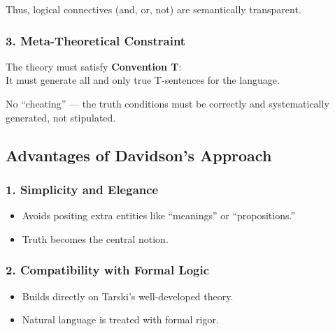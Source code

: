\documentclass[12pt]{article}
\newcommand{\tightlist}{\itemsep 0pt\parskip 0pt\parsep 0pt}
\begin{document}
Thus, logical connectives (and, or, not) are semantically transparent.

\hypertarget{meta-theoretical-constraint}{%
\subsubsection{\texorpdfstring{3. \textbf{Meta-Theoretical
Constraint}}{3. Meta-Theoretical Constraint}}\label{meta-theoretical-constraint}}

The theory must satisfy \textbf{Convention T}:\\
It must generate all and only true T-sentences for the language.

No ``cheating'' --- the truth conditions must be correctly and
systematically generated, not stipulated.

\hypertarget{advantages-of-davidsons-approach}{%
\subsection{Advantages of Davidson's
Approach}\label{advantages-of-davidsons-approach}}

\hypertarget{simplicity-and-elegance}{%
\subsubsection{\texorpdfstring{1. \textbf{Simplicity and
Elegance}}{1. Simplicity and Elegance}}\label{simplicity-and-elegance}}

\begin{itemize}
\tightlist
\item
  Avoids positing extra entities like ``meanings'' or ``propositions.''
\item
  Truth becomes the central notion.
\end{itemize}

\hypertarget{compatibility-with-formal-logic}{%
\subsubsection{\texorpdfstring{2. \textbf{Compatibility with Formal
Logic}}{2. Compatibility with Formal Logic}}\label{compatibility-with-formal-logic}}

\begin{itemize}
\tightlist
\item
  Builds directly on Tarski's well-developed theory.
\item
  Natural language is treated with formal rigor.
\end{itemize}
\end{document}
